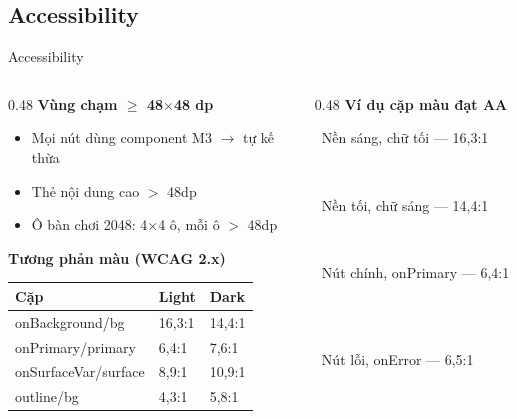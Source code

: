 \subsection{Accessibility}
\begin{frame}{Accessibility}
\begin{columns}[T]
\begin{column}{0.48\textwidth}
{\small\textbf{Vùng chạm $\geq$ 48$\times$48 dp}}\vspace{1mm}
{\tiny
\begin{itemize}\setlength{\itemsep}{2pt}
\item Mọi nút dùng component M3 $\rightarrow$ tự kế thừa
\item Thẻ nội dung cao $>$ 48dp
\item Ô bàn chơi 2048: 4$\times$4 ô, mỗi ô $>$ 48dp
\end{itemize}}\vspace{2mm}
{\small\textbf{Tương phản màu (WCAG 2.x)}}\vspace{1mm}
{\tiny
\begin{tabular}{@{}lll@{}}
\toprule
\textbf{Cặp} & \textbf{Light} & \textbf{Dark} \\
\midrule
onBackground/bg & 16,3:1 & 14,4:1 \\
onPrimary/primary & 6,4:1 & 7,6:1 \\
onSurfaceVar/surface & 8,9:1 & 10,9:1 \\
outline/bg & 4,3:1 & 5,8:1 \\
\bottomrule
\end{tabular}}
\end{column}
\begin{column}{0.48\textwidth}
{\small\textbf{Ví dụ cặp màu đạt AA}}\vspace{1mm}

\colorbox[HTML]{FBF8FB}{\textcolor[HTML]{131315}{\rule{0pt}{0.28cm}~Nền sáng, chữ tối --- 16,3:1 \textcolor{GreenOK}{\checkmark}~}}\\[3pt]
\colorbox[HTML]{131315}{\textcolor[HTML]{FBF8FB}{\rule{0pt}{0.28cm}~Nền tối, chữ sáng --- 14,4:1 \textcolor{GreenOK}{\checkmark}~}}\\[3pt]
\colorbox[HTML]{0057BD}{\textcolor[HTML]{F0F2FF}{\rule{0pt}{0.28cm}~Nút chính, onPrimary --- 6,4:1 \textcolor{GreenOK}{\checkmark}~}}\\[3pt]
\colorbox[HTML]{B31B25}{\textcolor[HTML]{FFFFFF}{\rule{0pt}{0.28cm}~Nút lỗi, onError --- 6,5:1 \textcolor{GreenOK}{\checkmark}~}}
\vspace{2.5mm}


\end{column}
\end{columns}
\end{frame}
